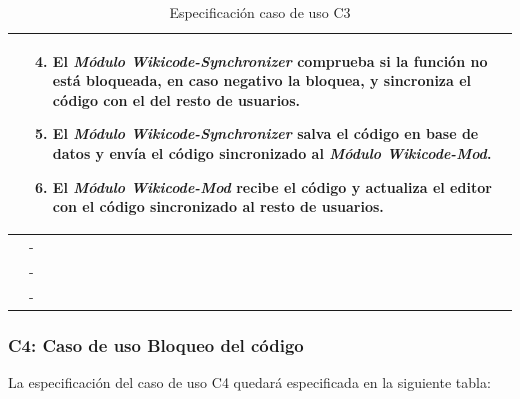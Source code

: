\begin{table}[h]
\centering
\begin{tabular}{ | p{} | p{} | }
	\hline
	\cellcolor[gray]{.8}{Pasos} & \begin{enumerate}
		\setcounter{enumi}{3}
		\item El \emph{Módulo Wikicode-Synchronizer} comprueba si la función no está bloqueada, en caso negativo la bloquea, y sincroniza el código con el del resto de usuarios.
		\item El \emph{Módulo Wikicode-Synchronizer} salva el código en base de datos y envía el código sincronizado al \emph{Módulo Wikicode-Mod}.
		\item El \emph{Módulo Wikicode-Mod} recibe el código y actualiza el editor con el código sincronizado al resto de usuarios. 
		\end{enumerate} \\
	\hline
	\cellcolor[gray]{.8}{Variaciones} & - \\
	\hline
	\cellcolor[gray]{.8}{Requisitos no funcionales} & - \\
	\hline
	\cellcolor[gray]{.8}{Cuestiones} & - \\
	\hline
\end{tabular}
\caption{Especificación caso de uso C3}
\end{table}

\newpage

\subsubsection{C4: Caso de uso Bloqueo del código}

La especificación del caso de uso C4 quedará especificada en la siguiente tabla:

